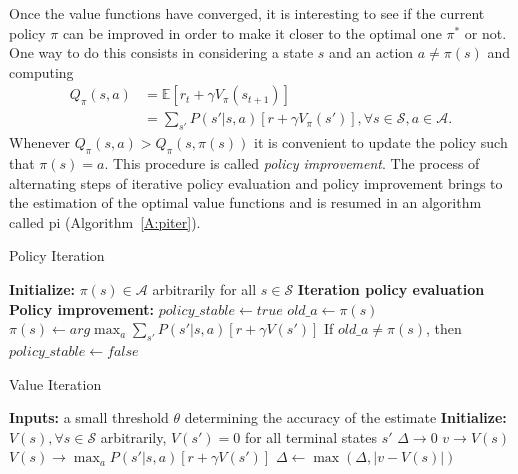 Once the value functions have converged, it is interesting to see if the current policy $\pi$ can be improved in order to make it closer to the optimal one $\pi^*$ or not. One way to do this consists in considering a state $s$ and an action $a \neq \pi(s)$ and computing
\begin{align}
 Q_\pi(s,a) &= \mathbb{E}[r_t + \gamma V_\pi(s_{t+1})]\nonumber\\
            &= \sum_{s'} P(s' | s,a)[r + \gamma V_\pi(s')], \forall s \in \mathcal{S}, a \in \mathcal{A}.
\end{align}
Whenever $Q_\pi(s,a) > Q_\pi(s, \pi(s))$ it is convenient to update the policy such that $\pi(s) = a$. This procedure is called \textit{policy improvement}.
The process of alternating steps of iterative policy evaluation and policy improvement brings to the estimation of the optimal value functions and is resumed in an algorithm called \gls{pi} (Algorithm~\ref{A:piter}).
\begin{algorithm}[t]
 \caption{Policy Iteration}
 \begin{algorithmic}[1]\label{A:piter}
  \STATE \textbf{Initialize:} $\pi(s) \in \mathcal{A}$ arbitrarily for all $s \in \mathcal{S}$
  \REPEAT
  \STATE \textbf{Iteration policy evaluation}
  \STATE \textbf{Policy improvement:}
  \STATE $policy\_stable \gets true$
  \STATE $old\_a \gets \pi(s)$
  \STATE $\pi(s) \gets arg\max_a \sum_{s'} P(s'|s,a)[r + \gamma V(s')]$
  \STATE If $old\_a \neq \pi(s)$, then $policy\_stable \gets false$
  \ENDFOR
 \end{algorithmic}
\end{algorithm}

\begin{algorithm}[t]
 \caption{Value Iteration}
 \begin{algorithmic}[1]\label{A:viter}
  \STATE \textbf{Inputs:} a small threshold $\theta$ determining the accuracy of the estimate
  \STATE \textbf{Initialize:} $V(s), \forall s \in \mathcal{S}$ arbitrarily, $V(s') = 0$ for all terminal states $s'$
  \REPEAT
  \STATE $\Delta \to 0$
  \STATE $v \to V(s)$
  \STATE $V(s) \to \max_{a} P(s'|s,a)[r + \gamma V(s')]$
  \STATE $\Delta \gets \max(\Delta, |v - V(s)|)$
  \ENDFOR
  \UNTIL{$\Delta < \theta$}
 \end{algorithmic}
\end{algorithm}

